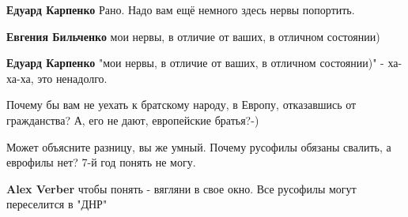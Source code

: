 \begin{itemize}
\begin{itemize}
 
\textbf{Едуард Карпенко} Рано. Надо вам ещё немного здесь нервы попортить.

 
\textbf{Евгения Бильченко} мои нервы, в отличие от ваших, в отличном состоянии)

 
\textbf{Едуард Карпенко} "мои нервы, в отличие от ваших, в отличном состоянии)" - ха-ха-ха, это ненадолго. \Smiley[1.0][yellow]

 

Почему бы вам не уехать к братскому народу, в Европу, отказавшись от
гражданства? А, его не дают, европейские братья?-)

Может объясните разницу, вы же умный. Почему русофилы обязаны свалить, а
еврофилы нет? 7-й год понять не могу.

 
\textbf{Alex Verber} чтобы понять - вягляни в свое окно. Все русофилы могут переселится в "ДНР"

 

\end{itemize}
\end{itemize}
